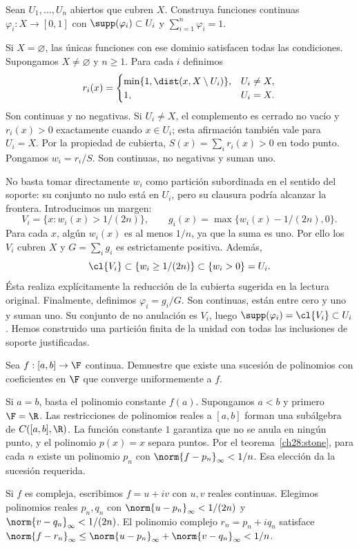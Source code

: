 \begin{ejercicio}\label{ej:lectura-12-3}
Sean $U_1,\ldots,U_n$ abiertos que cubren $X$. Construya funciones continuas $\varphi_i:X\to[0,1]$ con $\supp(\varphi_i)\subset U_i$ y $\sum_{i=1}^n\varphi_i=1$.
\end{ejercicio}
\begin{solucion}
Si $X=\varnothing$, las únicas funciones con ese dominio satisfacen todas las condiciones. Supongamos $X\ne\varnothing$ y $n\geq1$. Para cada $i$ definimos
\[
 r_i(x)=\begin{cases}
 \min\{1,\dist(x,X\setminus U_i)\},&U_i\ne X,\\
 1,&U_i=X.
 \end{cases}
\]
Son continuas y no negativas. Si $U_i\ne X$, el complemento es cerrado no vacío y $r_i(x)>0$ exactamente cuando $x\in U_i$; esta afirmación también vale para $U_i=X$. Por la propiedad de cubierta, $S(x)=\sum_i r_i(x)>0$ en todo punto. Pongamos $w_i=r_i/S$. Son continuas, no negativas y suman uno.

No basta tomar directamente $w_i$ como partición subordinada en el sentido del soporte: su conjunto no nulo está en $U_i$, pero su clausura podría alcanzar la frontera. Introducimos un margen:
\[
 V_i=\{x:w_i(x)>1/(2n)\},\qquad
 g_i(x)=\max\{w_i(x)-1/(2n),0\}.
\]
Para cada $x$, algún $w_i(x)$ es al menos $1/n$, ya que la suma es uno. Por ello los $V_i$ cubren $X$ y $G=\sum_i g_i$ es estrictamente positiva. Además,
\[
 \cl{V_i}\subset\{w_i\geq1/(2n)\}\subset\{w_i>0\}=U_i.
\]
Ésta realiza explícitamente la reducción de la cubierta sugerida en la lectura original. Finalmente, definimos $\varphi_i=g_i/G$. Son continuas, están entre cero y uno y suman uno. Su conjunto de no anulación es $V_i$, luego $\supp(\varphi_i)=\cl{V_i}\subset U_i$. Hemos construido una partición finita de la unidad con todas las inclusiones de soporte justificadas.
\end{solucion}

\begin{ejercicio}\label{ej:lectura-28-1}
Sea $f:[a,b]\to\F$ continua. Demuestre que existe una sucesión de polinomios con coeficientes en $\F$ que converge uniformemente a $f$.
\end{ejercicio}
\begin{solucion}
Si $a=b$, basta el polinomio constante $f(a)$. Supongamos $a<b$ y primero $\F=\R$. Las restricciones de polinomios reales a $[a,b]$ forman una subálgebra de $C([a,b],\R)$. La función constante $1$ garantiza que no se anula en ningún punto, y el polinomio $p(x)=x$ separa puntos. Por el teorema~\ref{ch28:stone}, para cada $n$ existe un polinomio $p_n$ con $\norm{f-p_n}_\infty<1/n$. Esa elección da la sucesión requerida.

Si $f$ es compleja, escribimos $f=u+iv$ con $u,v$ reales continuas. Elegimos polinomios reales $p_n,q_n$ con $\norm{u-p_n}_\infty<1/(2n)$ y $\norm{v-q_n}_\infty<1/(2n)$. El polinomio complejo $r_n=p_n+iq_n$ satisface
$\norm{f-r_n}_\infty\le\norm{u-p_n}_\infty+\norm{v-q_n}_\infty<1/n$.
\end{solucion}

